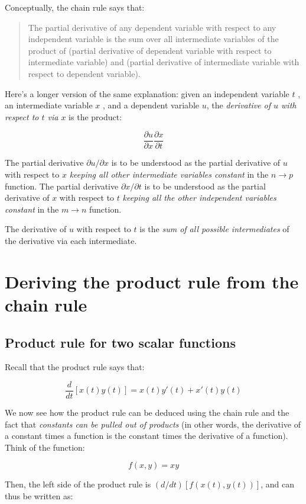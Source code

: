\documentclass[10pt]{amsart}
\begin{document}
Conceptually, the chain rule says that:

\begin{quote}
  The partial derivative of any dependent variable with respect to any
  independent variable is the sum over all intermediate variables of
  the product of (partial derivative of dependent variable with
  respect to intermediate variable) and (partial derivative of
  intermediate variable with respect to dependent variable).
\end{quote}

Here's a longer version of the same explanation: given an independent
variable $t$ , an intermediate variable $x$ , and a dependent variable
$u$, the {\em derivative of $u$ with respect to $t$ via $x$} is the
product:

$$\frac{\partial u}{\partial x}\frac{\partial x}{\partial t}$$

The partial derivative $\partial u/\partial x$ is to be understood as
the partial derivative of $u$ with respect to $x$ {\em keeping all
  other intermediate variables constant} in the $n \to p$
function. The partial derivative $\partial x/\partial t$ is to be
understood as the partial derivative of $x$ with respect to $t$ {\em
  keeping all the other independent variables constant} in the $m \to
n$ function.

The derivative of $u$ with respect to $t$ is the {\em sum of all
  possible intermediates} of the derivative via each intermediate.

\section{Deriving the product rule from the chain rule}

\subsection{Product rule for two scalar functions}

Recall that the product rule says that:

$$\frac{d}{dt}[x(t)y(t)] = x(t)y'(t) + x'(t)y(t)$$

We now see how the product rule can be deduced using the chain rule
and the fact that {\em constants can be pulled out of products} (in
other words, the derivative of a constant times a function is the
constant times the derivative of a function). Think of the function:

$$f(x,y) = xy$$

Then, the left side of the product rule is $(d/dt)[f(x(t),y(t))]$, and
can thus be written as:
\end{document}
